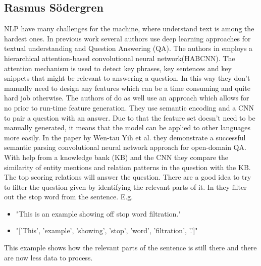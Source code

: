 \subsection{Rasmus Södergren}
NLP have many challenges for the machine, where understand text is among the hardest ones. In previous work several authors use deep learning approaches for textual understanding and Question Answering (QA). The authors in \cite{DBLP:journals/corr/YinES16} employs a hierarchical attention-based convolutional neural network(HABCNN). The attention mechanism is used to detect key phrases, key sentences and key snippets that might be relevant to answering a question. In this way they don't manually need to design any features which can be a time consuming and quite hard job otherwise. The authors of \cite{DBLP:journals/corr/YuHBP14} do as well use an approach which allows for no prior to run-time feature generation. They use semantic encoding and a CNN to pair a question with an answer.     
Due to that the feature set doesn't need to be manually generated, it means that the model can be applied to other languages more easily.   
In the paper by Wen-tau Yih et al.\cite{yih2014semantic} they demonstrate a successful semantic parsing convolutional neural network approach for open-domain QA. With help from a knowledge bank (KB) and the CNN they compare the similarity of entity mentions and relation patterns in the question with the KB. The top scoring relations will answer the question.
There are a good idea to try to filter the question given by identifying the relevant parts of it. In \cite{DBLP:journals/corr/YuHBP14} they filter out the stop word from the sentence. E.g. 
\begin{itemize}
    \item "This is an example showing off stop word filtration."
    \item "['This', 'example', 'showing', 'stop', 'word', 'filtration', '.']"
\end{itemize}
This example shows how the relevant parts of the sentence is still there and there are now less data to process.  
